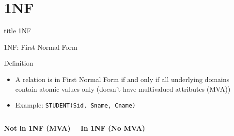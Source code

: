 \documentclass[aspectratio=169, xcolor=dvipsnames]{beamer}
\begin{document}
\section{1NF}
\begin{frame}
  \vfill
  \centering
  \begin{beamercolorbox}[sep=8pt,center,shadow=true,rounded=true]{title}
    1NF\par%
  \end{beamercolorbox}
  \vfill
\end{frame}

\begin{frame}{1NF: First Normal Form}
    \begin{block}{Definition}
        \begin{itemize}[<+->]
            \item A relation is in First Normal Form if and only if all underlying domains contain atomic values only (doesn't have multivalued attributes (MVA))
            \item Example: \texttt{STUDENT(Sid, Sname, Cname)}
        \end{itemize}
    \end{block}
    \vspace{0.5em}
    \begin{columns}
        \textbf{Not in 1NF (MVA)}
        \begin{table}
        \end{table}
        \textbf{In 1NF (No MVA)}
        \begin{table}
        \end{table}
    \end{columns}
\end{frame}
\end{document}
